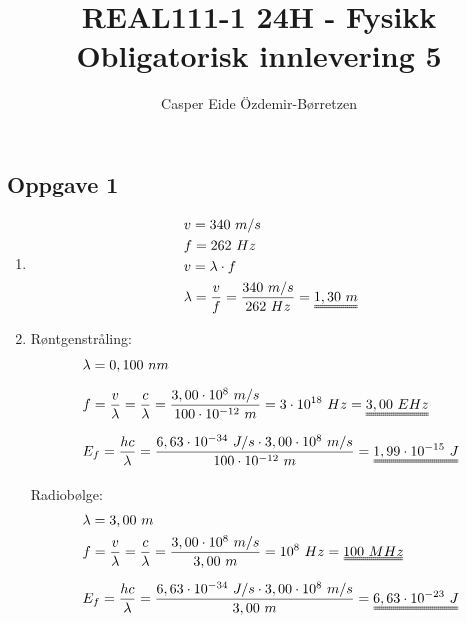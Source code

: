 \documentclass[11pt,a4paper]{report}
\title{REAL111-1 24H - Fysikk\\Obligatorisk innlevering 5}
\author{Casper Eide Özdemir-Børretzen}
\date{}
\newcommand{\opgd}[1]{\item[#1)]}
\newcommand{\opg}[1]{\subsection*{Oppgave #1}}
\begin{document}



\opg{1}
\begin{enumerate}[leftmargin=*,itemsep=1cm,labelsep=2em,label=\alph*)]
\opgd{a}
\begin{align*}
&v = 340\ m/s\\
&f = 262\ Hz\\
&v = \lambda \cdot f\\
&\lambda = \frac{v}{f} = \frac{340\ m/s}{262\ Hz} = \uuline{1,30\ m}\\
\end{align*}
\opgd{b}
Røntgenstråling:
\begin{align*}
&\lambda = 0,100\ nm\\[0.2cm]
&f = \frac{v}{\lambda} = \frac{c}{\lambda} = \frac{3,00 \cdot 10^8\ m/s}{100 \cdot 10^{-12}\ m} = 3 \cdot 10^{18}\ Hz = \uuline{3,00\ EHz}\\[0.2cm]
&E_f = \frac{hc}{\lambda} = \frac{6,63 \cdot 10^{-34}\ J/s \cdot 3,00 \cdot 10^8\ m/s}{100 \cdot 10^{-12}\ m} = \uuline{1,99 \cdot 10^{-15}\ J}\\[0.2cm]
\end{align*}
Radiobølge:
\begin{align*}
&\lambda = 3,00\ m\\
&f = \frac{v}{\lambda} = \frac{c}{\lambda} = \frac{3,00 \cdot 10^8\ m/s}{3,00\ m} = 10^{8}\ Hz = \uuline{100\ MHz}\\[0.2cm]
&E_f = \frac{hc}{\lambda} = \frac{6,63 \cdot 10^{-34}\ J/s \cdot 3,00 \cdot 10^8\ m/s}{3,00\ m} = \uuline{6,63 \cdot 10^{-23}\ J}\\[0.2cm]
\end{align*}
\end{enumerate}

\end{document}
